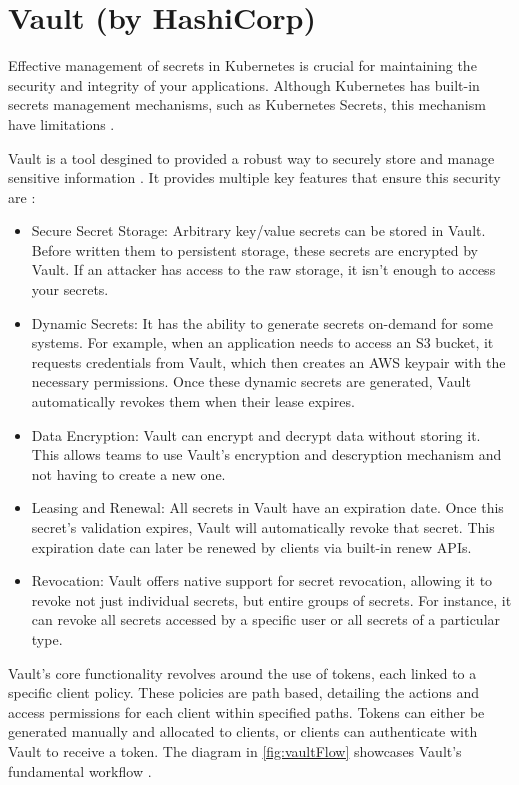 \documentclass[a4paper,11pt,openright,BCOR=15mm]{scrbook}
\begin{document}
\section{Vault (by HashiCorp)}\label{sect:complementSecrets}

Effective management of secrets in Kubernetes is crucial for maintaining the security and integrity of your applications. Although Kubernetes has built-in secrets management mechanisms, such as Kubernetes Secrets, this mechanism have limitations \cite{muppeda_guide_vault_2024}.

Vault is a tool desgined to provided a robust way to securely store and manage sensitive information \cite{muppeda_guide_vault_2024}. It provides multiple key features that ensure this security are \cite{vault_doc_introduction_nodate}:

\begin{itemize}
	\item Secure Secret Storage: Arbitrary key/value secrets can be stored in Vault. Before written them to persistent storage, these secrets are encrypted by Vault. If an attacker has access to the raw storage, it isn't enough to access your secrets.
	\item Dynamic Secrets: It has the ability to generate secrets on-demand for some systems. For example, when an application needs to access an S3 bucket, it requests credentials from Vault, which then creates an AWS keypair with the necessary permissions. Once these dynamic secrets are generated, Vault automatically revokes them when their lease expires.
	\item Data Encryption: Vault can encrypt and decrypt data without storing it. This allows teams to use Vault's encryption and descryption mechanism and not having to create a new one.
	\item Leasing and Renewal: All secrets in Vault have an expiration date. Once this secret's validation expires, Vault will automatically revoke that secret. This expiration date can later be renewed by clients via built-in renew APIs.
	\item Revocation: Vault offers native support for secret revocation, allowing it to revoke not just individual secrets, but entire groups of secrets. For instance, it can revoke all secrets accessed by a specific user or all secrets of a particular type.
\end{itemize}

Vault's core functionality revolves around the use of tokens, each linked to a specific client policy. These policies are path based, detailing the actions and access permissions for each client within specified paths. Tokens can either be generated manually and allocated to clients, or clients can authenticate with Vault to receive a token. The diagram in \ref{fig:vaultFlow} showcases Vault's fundamental workflow \cite{vault_doc_introduction_nodate}.
\end{document}
